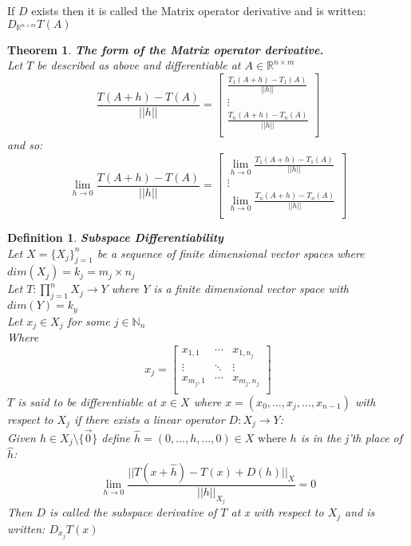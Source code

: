 \documentclass[12pt]{extarticle}
\theoremstyle{plain}
\newtheorem{thm}{Theorem}[section]
\theoremstyle{plain}
\theoremstyle{Definition}
\newtheorem{def.}{Definition}[section]
\theoremstyle{Definition}
\theoremstyle{plain}
\begin{document}
If $D$ exists then it is called the Matrix operator derivative and is written: $D_{\mathbb{R}^{n \times m}}T(A)$ \\ 
\begin{thm} \textbf{The form of the Matrix operator derivative.} \\ 
	Let $T$ be described as above and differentiable at $A \in \mathbb{R}^{n \times m}$ \\ 
	\[
	\frac{T(A + h) - T(A)}{||h||} = 
	\begin{bmatrix}
	\frac{T_1(A + h) - T_1(A)}{||h||} \\ 
	\vdots \\ 
	\frac{T_n(A + h) - T_n(A)}{||h||} \\ 	
	\end{bmatrix}
	\]
	and so: \\ 
	\[
	\lim_{h \to 0} \frac{T(A + h) - T(A)}{||h||} = 
	\begin{bmatrix}
	\lim_{h \to 0} \frac{T_1(A + h) - T_1(A)}{||h||} \\ 
	\vdots \\ 
	\lim_{h \to 0} \frac{T_n(A + h) - T_n(A)}{||h||} \\ 	
	\end{bmatrix}
	\]	
\end{thm}
\newpage
\begin{def.} \textbf{Subspace Differentiability} \\ 
	Let $X = \{X_j\}_{j=1}^{n}$ be a sequence of finite dimensional vector spaces where $dim(X_j) = k_j = m_j \times n_j$ \\ 
	Let $T : \prod_{j=1}^{n} X_j \to Y$ where $Y$ is a finite dimensional vector space with $dim(Y) = k_y$ \\ 
	Let $x_j \in X_j$ for some $j \in \mathbb{N}_n$ \\ 
	Where 
	\[
	x_j = 
	\begin{bmatrix}
	x_{1,1} & \cdots & x_{1,n_j} \\ 
	\vdots & \ddots & \vdots \\
	x_{m_j,1} & \cdots & x_{m_j,n_j} \\ 	
	\end{bmatrix}
	\]
	$T$ is said to be differentiable at $x \in X$ where $x = (x_0,...,x_j,...,x_{n-1})$ with respect to $X_j$ if there exists a linear operator $D : X_j \to Y$: \\ 
	Given $h \in X_j \setminus \{\vec{0}\}$ define $\hat{h} = (0,...,h,...,0) \in X \text{ where } h$ is in the j'th place of $\hat{h}$: \\
	$$\lim_{h \to 0} \frac{||T(x + \hat{h}) - T(x) + D(h)||_{X}}{||h||_{X_j}} = 0$$
	Then $D$ is called the subspace derivative of $T$ at x with respect to $X_j$ and is written: $D_{x_j} T(x)$ \\ 
\end{def.}
\end{document}
